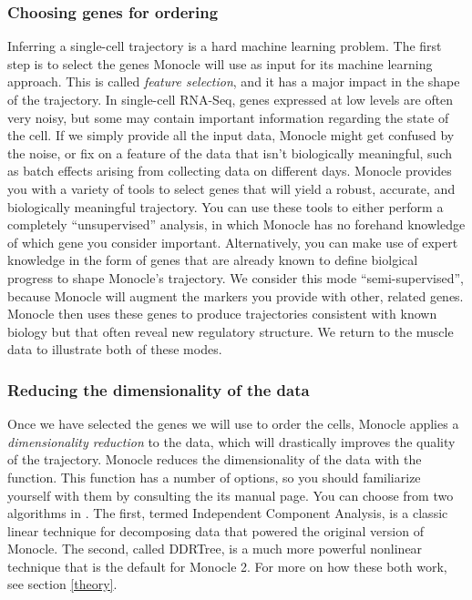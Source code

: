 \documentclass[10pt,oneside]{article}\usepackage[]{graphicx}\usepackage[]{color}
\begin{document}
 \subsubsection{Choosing genes for ordering}
 Inferring a single-cell trajectory is a hard machine learning problem. The first step is to select the genes Monocle will use as input for its machine learning approach. This is called \emph{feature selection}, and it has a major impact in the shape of the trajectory. In single-cell RNA-Seq, genes expressed at low levels are often very noisy, but some may contain important information regarding the state of the cell.  If we simply provide all the input data, Monocle might get confused by the noise, or fix on a feature of the data that isn't biologically meaningful, such as batch effects arising from collecting data on different days. Monocle provides you with a variety of tools to select genes that will yield a robust, accurate, and biologically meaningful trajectory. You can use these tools to either perform a completely ``unsupervised'' analysis, in which Monocle has no forehand knowledge of which gene you consider important. Alternatively, you can make use of expert knowledge in the form of genes that are already known to define biolgical progress to shape Monocle's trajectory. We consider this mode ``semi-supervised'', because Monocle will augment the markers you provide with other, related genes. Monocle then uses these genes to produce trajectories consistent with known biology but that often reveal new regulatory structure. We return to the muscle data to illustrate both of these modes.
 
 \subsubsection{Reducing the dimensionality of the data}
 Once we have selected the genes we will use to order the cells, Monocle applies a \emph{dimensionality reduction} to the data, which will drastically improves the quality of the trajectory. Monocle reduces the dimensionality of the data with the  function. This function has a number of options, so you should familiarize yourself with them by consulting the its manual page. You can choose from two algorithms in . The first, termed Independent Component Analysis, is a classic linear technique for decomposing data that powered the original version of Monocle. The second, called DDRTree, is a much more powerful nonlinear technique that is the default for Monocle 2.  For more on how these both work, see section \ref{theory}.   
 
\end{document}
